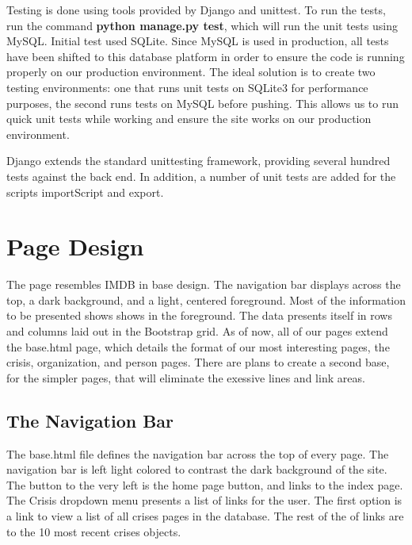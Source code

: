 \documentclass[12pt]{report}
\begin{document}
Testing is done using tools provided by Django and unittest.
To run the tests, run the command \textbf{python manage.py test}, which will run the unit tests using MySQL.
Initial test used SQLite. Since MySQL is used in production, all tests have been shifted to this database platform in order to ensure the code 
is running properly on our production environment.
The ideal solution is to create two testing environments: one that runs unit tests on SQLite3 for performance purposes,
the second runs tests on MySQL before pushing.
This allows us to run quick unit tests while working and ensure the site works on our production environment.


Django extends the standard unittesting framework, providing several hundred tests against the back end.
In addition, a number of unit tests are added for the scripts importScript and export.


\newpage
\section*{Page Design}
\hfill


The page resembles IMDB in base design.
The navigation bar displays across the top, a dark background, and a light, centered foreground.
Most of the information to be presented shows shows in the foreground.
The data presents itself in rows and columns laid out in the Bootstrap grid.
As of now, all of our pages extend the base.html page,
which details the format of our most interesting pages, the crisis, organization, and person pages.
There are plans to create a second base, for the simpler pages, that will eliminate the exessive
lines and link areas.
\\


\subsection*{The Navigation Bar}
\hfill

The base.html file defines the navigation bar across the top of every page.
The navigation bar is left light colored to contrast the dark background of the site.
The button to the very left is the home page button, and links to the index page.
\\


The Crisis dropdown menu presents a list of links for the user.
The first option is a link to view a list of all crises pages in the database.
The rest of the of links are to the 10 most recent crises objects.
\\
\end{document}
